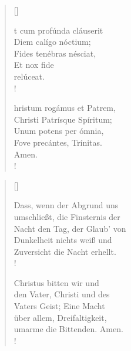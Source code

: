 {\setlength{\columnsep}{1cm}
\begin{multicols}{2} 
\begin{verse}[\versewidth]

{\small{t cum profúnda cláuserit\\
Diem calígo nóctium;\\ 
Fides tenébras nésciat,\\
Et nox fide\\
relúceat.\\!

hristum rogámus et Patrem,\\ 
Christi Patrísque Spíritum;\\
Unum potens per ómnia,\\ 
Fove precántes, Trínitas.\\
Amen.\\!}}
\end{verse}

\columnbreak

\begin{verse}[\versewidth]
 
{\small\rm{ Dass, wenn der Abgrund uns\\
umschließt, die Finsternis der\\
Nacht den Tag, der Glaub' von\\
Dunkelheit nichts weiß und\\
Zuversicht die Nacht erhellt.\\!

 Christus bitten wir und\\
den Vater, Christi und des\\
Vaters Geist; Eine Macht\\
über allem, Dreifaltigkeit,\\
umarme die Bittenden. Amen.\\!}}
 
 
\end{verse}

\end{multicols}
}

\medskip

\def\greinitialformat#1{{\fontsize{40}{40}\selectfont #1}}
\gresetfirstlineaboveinitial{\small \textcolor{red}{æstate}}{}
\setaboveinitialseparation{0.72mm}

\medskip

